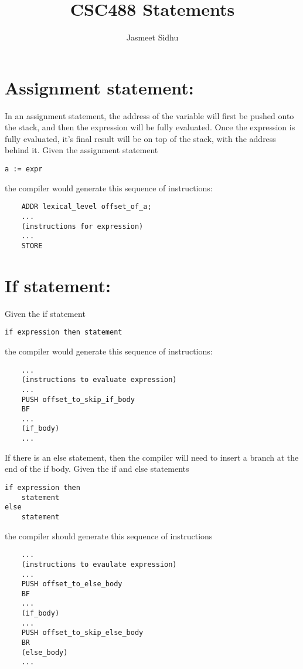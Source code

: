 \documentclass{article}
\author{Jasmeet Sidhu}
\title{CSC488 Statements}
\begin{document}
\maketitle


\section{Assignment statement:}
In an assignment statement, the address of the variable will first be pushed onto the stack,
and then the expression will be fully evaluated. Once the expression is fully evaluated, it's final result will be on top of the stack, with the address behind it.
\newline
\newline
Given the assignment statement
\begin{lstlisting}
a := expr
\end{lstlisting}
the compiler would generate this sequence of instructions:
\newline
\begin{lstlisting}
    ADDR lexical_level offset_of_a;
    ...
    (instructions for expression)
    ...
    STORE
\end{lstlisting}

\section{If statement:}
Given the if statement
\begin{lstlisting}
if expression then statement
\end{lstlisting}
the compiler would generate this sequence of instructions:
\begin{lstlisting}
    ...
    (instructions to evaluate expression)
    ...
    PUSH offset_to_skip_if_body
    BF
    ...
    (if_body)
    ...
\end{lstlisting}

\noindent
If there is an else statement, then the compiler will need to insert a branch at the end of the if body.
\newline
Given the if and else statements
\begin{lstlisting}
if expression then
    statement
else
    statement
\end{lstlisting}
the compiler should generate this sequence of instructions
\begin{lstlisting}
    ...
    (instructions to evaulate expression)
    ...
    PUSH offset_to_else_body
    BF
    ...
    (if_body)
    ...
    PUSH offset_to_skip_else_body
    BR
    (else_body)
    ...
    
\end{lstlisting}
\end{document}
